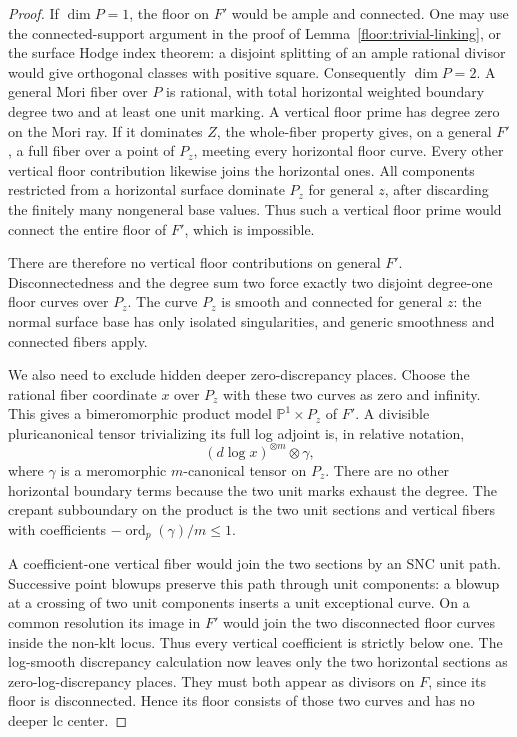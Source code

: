 \documentclass[11pt,letterpaper]{article}
\newcommand{\PP}{\mathbb{P}}
\DeclareMathOperator{\ord}{ord}
\theoremstyle{definition}
\theoremstyle{remark}
\begin{document}
\begin{proof}
If $\dim P=1$, the floor on $F'$ would be
ample and connected.  One may use the
connected-support argument in the proof of
Lemma~\ref{floor:trivial-linking}, or the
surface Hodge index theorem: a disjoint
splitting of an ample rational divisor would
give orthogonal classes with positive square.
Consequently $\dim P=2$.  A general Mori
fiber over $P$ is rational, with total
horizontal weighted boundary degree two and
at least one unit marking.  A vertical floor
prime has degree zero on the Mori ray.  If
it dominates $Z$, the whole-fiber property
gives, on a general $F'$, a full fiber over
a point of $P_z$, meeting every horizontal
floor curve.  Every other vertical floor
contribution likewise joins the horizontal
ones.  All components restricted from a
horizontal surface dominate $P_z$ for
general $z$, after discarding the finitely
many nongeneral base values.  Thus such a
vertical floor prime would connect the
entire floor of $F'$, which is impossible.

There are therefore no vertical floor
contributions on general $F'$.  Disconnectedness
and the degree sum two force exactly two
disjoint degree-one floor curves over $P_z$.
The curve $P_z$ is smooth and connected for
general $z$: the normal surface base has
only isolated singularities, and generic
smoothness and connected fibers apply.

We also need to exclude hidden deeper
zero-discrepancy places.  Choose the rational
fiber coordinate $x$ over $P_z$ with these
two curves as zero and infinity.  This gives
a bimeromorphic product model
$\PP^1\times P_z$ of $F'$.  A divisible
pluricanonical tensor trivializing its full
log adjoint is, in relative notation,
\begin{equation}
 \label{floor:surface-dlog-product}
 (d\log x)^{\otimes m}\otimes\gamma,
\end{equation}
where $\gamma$ is a meromorphic
$m$-canonical tensor on $P_z$.  There are
no other horizontal boundary terms because
the two unit marks exhaust the degree.
The crepant subboundary on the product is
the two unit sections and vertical fibers
with coefficients
$-\ord_p(\gamma)/m\le1$.

A coefficient-one vertical fiber would
join the two sections by an SNC unit path.
Successive point blowups preserve this
path through unit components: a blowup at
a crossing of two unit components inserts
a unit exceptional curve.  On a common
resolution its image in $F'$ would join
the two disconnected floor curves inside
the non-klt locus.  Thus every vertical
coefficient is strictly below one.  The
log-smooth discrepancy calculation now
leaves only the two horizontal sections
as zero-log-discrepancy places.  They
must both appear as divisors on $F$, since
its floor is disconnected.  Hence its
floor consists of those two curves and
has no deeper lc center.


\end{proof}
\end{document}
